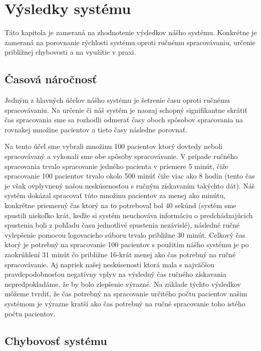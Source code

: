 \chapter{Výsledky systému}

Táto kapitola je zameraná na zhodnotenie výsledkov nášho systému. Konkrétne je zameraná na porovnanie rýchlosti systému oproti ručnému spracovávaniu, určenie približnej chybovosti a na využitie v praxi.

\section{Časová náročnosť}
\label{casNar}

Jedným z hlavných účelov nášho systému je šetrenie času oproti ručnému spracovávaniu. Na určenie či náš systém je naozaj schopný signifikantne skrátiť čas spracovania sme sa rozhodli odmerať časy oboch spôsobov spracovania na rovnakej množine pacientov a tieto časy následne porovnať. 

Na tento účel sme vybrali množinu 100 pacientov ktorý dovtedy neboli spracovávaný a vykonali sme obe spôsoby spracovávanie. V prípade ručného spracovania trvalo spracovanie jedného pacienta v priemere 5 minút, čiže spracovanie 100 pacientov trvalo okolo 500 minúť čiže viac ako 8 hodín (tento čas je však ovplyvnený našou neskúsenosťou s ručným získavaním takýchto dát). Náš systém dokázal spracovať túto množinu pacientov za menej ako minútu, konkrétne priemerný čas ktorý na to potreboval bol 40 sekúnd (systém sme spustili niekoľko krát, keďže si systém neuchováva informáciu o predchádzajúcich spustenia boli z pohľadu času jednotlivé spustenia nezávislé), následné ručné vylepšenie pomocou logovacieho súboru trvalo približne 30 minút. Celkový čas ktorý je potrebný na spracovanie 100 pacientov s použitím nášho systému je po zaokrúhlení 31 minút čo približne 16-krát menej ako čas potrebný na ručné spracovávanie. Aj napriek našej neskúsenosti ktorá mala s najväčšou pravdepodobnosťou negatívny vplyv na výsledný čas ručného získavania nepredpokladáme, že by bolo zlepšenie výrazné. Na základe týchto výsledkov môžeme tvrdiť, že čas potrebný na spracovanie určitého počtu pacientov našim systémom je výrazne kratší ako čas potrebný na ručné spracovanie toho istého počtu pacientov.

\section{Chybovosť systému}

